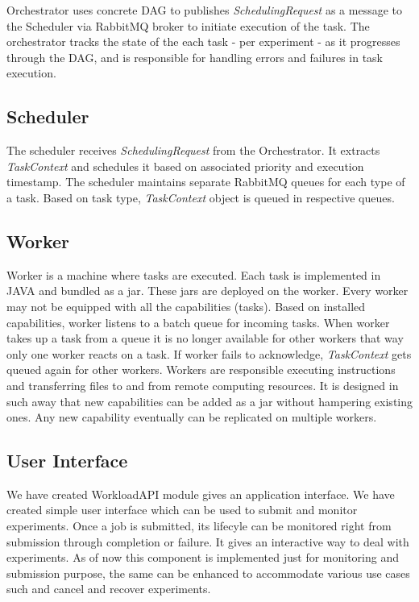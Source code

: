 \documentclass[sigconf]{acmart}
\begin{document}
Orchestrator uses concrete DAG to publishes \textit{SchedulingRequest} as a message to the Scheduler via RabbitMQ broker to initiate execution of the task. The orchestrator tracks the state of the each task - per experiment - as it progresses through the DAG, and is responsible for handling errors and failures in task execution.

\subsection{Scheduler}
The scheduler receives \textit{SchedulingRequest} from the Orchestrator. It extracts \textit{TaskContext} and schedules it based on associated priority and execution timestamp. The scheduler maintains separate RabbitMQ queues for each type of a task. Based on task type, \textit{TaskContext} object is queued in respective queues.

\subsection{Worker}
Worker is a  machine where tasks are executed. Each task is implemented in JAVA and bundled as a jar. These jars are deployed on the worker. Every worker may not be equipped with all the capabilities (tasks). Based on installed capabilities, worker listens to a batch queue for incoming tasks. When worker takes up a task from a queue it is no longer available for other workers that way only one worker reacts on a task. If worker fails to acknowledge, \textit{TaskContext} gets queued again for other workers. Workers are responsible executing instructions and transferring files to and from remote computing resources. It is designed in such  away that new capabilities can be added as a jar without hampering existing ones. Any new capability eventually can be replicated on multiple workers. 

\subsection{User Interface}
We have created WorkloadAPI module gives an application interface. We have created simple user interface which can be used to submit and monitor experiments. Once a job is submitted, its lifecyle can be monitored right from submission through completion or failure. It gives an interactive way to deal with experiments. As of now this component is implemented just for monitoring and submission purpose, the same can be enhanced to accommodate various use cases such and cancel and recover experiments.  
\end{document}
